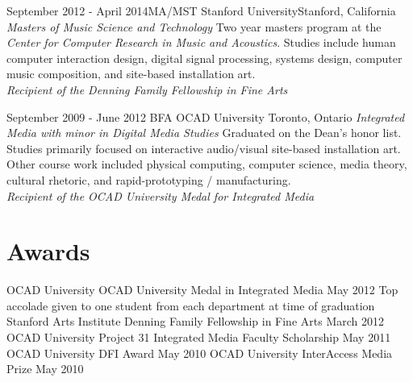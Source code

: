 \documentclass[10pt,a4paper,sans]{moderncv}   %
\begin{document}
\cventry
  {September 2012 - April 2014}{MA/MST}
  {Stanford University}{Stanford, California}
  {\textit{Masters of Music Science and Technology}}
  {Two year masters program at the \textit{Center for Computer Research in Music and Acoustics}.  Studies include human computer interaction design, digital signal processing, systems design, computer music composition, and site-based installation art. \\\textit{Recipient of the Denning Family Fellowship in Fine Arts }}

\cventry
  {September 2009 - June 2012}
  {BFA}
  {OCAD University}
  {Toronto, Ontario}
  {\textit{Integrated Media with minor in Digital Media Studies}}
  {Graduated on the Dean's honor list. Studies primarily focused on interactive audio/visual site-based installation art.  Other course work included physical computing, computer science, media theory, cultural rhetoric, and rapid-prototyping / manufacturing. \\\textit{Recipient of the OCAD University Medal for Integrated Media }}

\section{Awards}
\cventry
  {}{OCAD University}
  {OCAD University Medal in Integrated Media}
  {May 2012}{}
  {Top accolade given to one student from each department at time of graduation}
\cventry
  {}{Stanford Arts Institute}
  {Denning Family Fellowship in Fine Arts}
  {March 2012}{}{}
\cventry
  {}{OCAD University}
  {Project 31 Integrated Media Faculty Scholarship}
  {May 2011}{}{}
\cventry
  {}{OCAD University}
  {DFI Award}
  {May 2010}{}{}
\cventry
  {}{OCAD University}
  {InterAccess Media Prize}
  {May 2010}{}{}
\end{document}
